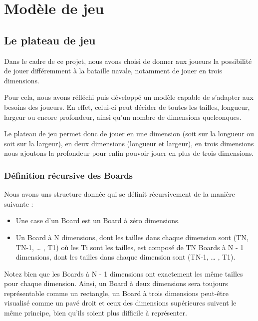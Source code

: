 \section{Modèle de jeu}

\subsection{Le plateau de jeu}

	Dans le cadre de ce projet, nous avons choisi de donner aux joueurs la possibilité de jouer différemment à la bataille navale, notamment de jouer en trois dimensions.\newline
	
	Pour cela, nous avons réfléchi puis développé un modèle capable de s'adapter aux besoins des joueurs. En effet, celui-ci peut décider de toutes les tailles, longueur, largeur ou encore profondeur, ainsi qu'un nombre de dimensions quelconques. \newline
	
	Le plateau de jeu permet donc de jouer en une dimension (soit sur la longueur ou soit sur la largeur), en deux dimensions (longueur et largeur), en trois dimensions nous ajoutons la profondeur pour enfin pouvoir jouer en plus de trois dimensions.\newline
	
	\subsubsection{Définition récursive des Boards}
		Nous avons uns structure donnée qui se définit récursivement de la manière suivante : \newline
		\begin{itemize}
		\item Une case d'un Board est un Board à zéro dimensions.\newline
		\newline	
		\item Un Board à N dimensions, dont les tailles dans chaque dimension sont (TN, TN-1, … , T1) où les Ti sont les tailles, est composé de TN Boards à N - 1 dimensions, dont les tailles dans chaque dimension sont (TN-1, … , T1). 
		\end{itemize}
			

	Notez bien que les Boards à N - 1 dimensions ont exactement les même tailles pour chaque dimension. Ainsi, un Board à deux dimensions sera toujours représentable comme un rectangle, un Board à trois dimensions peut-être visualisé comme un pavé droit et ceux des dimensions supérieures suivent le même principe, bien qu'ils soient plus difficile à représenter.
\newline

